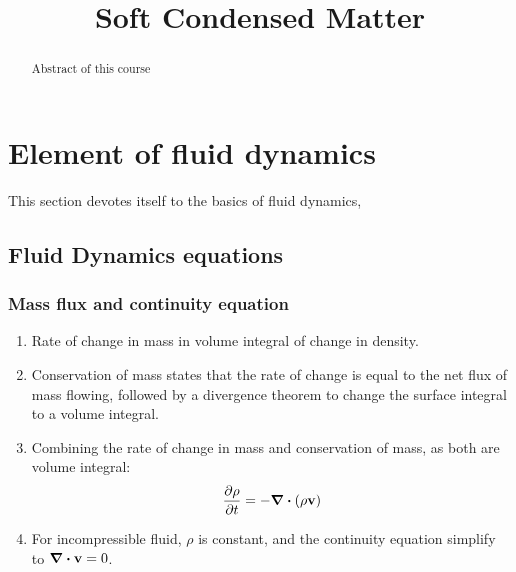 \documentclass[12pt,a4paper]{article}
\newcommand{\topic}{Soft Condensed Matter}
\begin{document}
\title{\topic}
\begin{titlepage}
    \maketitle
\end{titlepage}

\tableofcontents

\newpage
\begin{abstract}
\noindent
Abstract of this course
\end{abstract}

\section{Element of fluid dynamics}
This section devotes itself to the basics of fluid dynamics,
    \subsection{Fluid Dynamics equations}
        \subsubsection{Mass flux and continuity equation}
            \begin{enumerate}
                \item  Rate of change in mass in volume integral of change in density.
                \item  Conservation of mass states that the rate of change is equal to the net flux of mass flowing, 
                followed by a divergence theorem to change the surface integral to a volume integral.
                \item Combining the rate of change in mass and conservation of mass, as both are volume integral:            
                $$
                    \pdv{\rho}{t} = -\div(\rho \vb{v})
                $$
                \item For incompressible fluid, $\rho$ is constant, and the continuity equation simplify to $\div\vb{v} = 0$.
            \end{enumerate}
\end{document}
